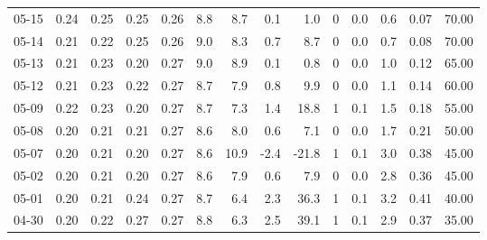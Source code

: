 \begin{threeparttable}
{\begin{tabular}{lrrrrrrrrrrrrr}
  05-15 &          0.24 &          0.25 &          0.25 &        0.26 &                 8.8 &                 8.7 &        0.1 &          1.0 &              0 &                 0.0 &              0.6 &            0.07 &                  70.00 \\
  05-14 &          0.21 &          0.22 &          0.25 &        0.26 &                 9.0 &                 8.3 &        0.7 &          8.7 &              0 &                 0.0 &              0.7 &            0.08 &                  70.00 \\
  05-13 &          0.21 &          0.23 &          0.20 &        0.27 &                 9.0 &                 8.9 &        0.1 &          0.8 &              0 &                 0.0 &              1.0 &            0.12 &                  65.00 \\
  05-12 &          0.21 &          0.23 &          0.22 &        0.27 &                 8.7 &                 7.9 &        0.8 &          9.9 &              0 &                 0.0 &              1.1 &            0.14 &                  60.00 \\
  05-09 &          0.22 &          0.23 &          0.20 &        0.27 &                 8.7 &                 7.3 &        1.4 &         18.8 &              1 &                 0.1 &              1.5 &            0.18 &                  55.00 \\
  05-08 &          0.20 &          0.21 &          0.21 &        0.27 &                 8.6 &                 8.0 &        0.6 &          7.1 &              0 &                 0.0 &              1.7 &            0.21 &                  50.00 \\
  05-07 &          0.20 &          0.21 &          0.20 &        0.27 &                 8.6 &                10.9 &       -2.4 &        -21.8 &              1 &                 0.1 &              3.0 &            0.38 &                  45.00 \\
  05-02 &          0.20 &          0.21 &          0.20 &        0.27 &                 8.6 &                 7.9 &        0.6 &          7.9 &              0 &                 0.0 &              2.8 &            0.36 &                  45.00 \\
  05-01 &          0.20 &          0.21 &          0.24 &        0.27 &                 8.7 &                 6.4 &        2.3 &         36.3 &              1 &                 0.1 &              3.2 &            0.41 &                  40.00 \\
  04-30 &          0.20 &          0.22 &          0.27 &        0.27 &                 8.8 &                 6.3 &        2.5 &         39.1 &              1 &                 0.1 &              2.9 &            0.37 &                  35.00 \\

\end{tabular}}
\end{threeparttable}
